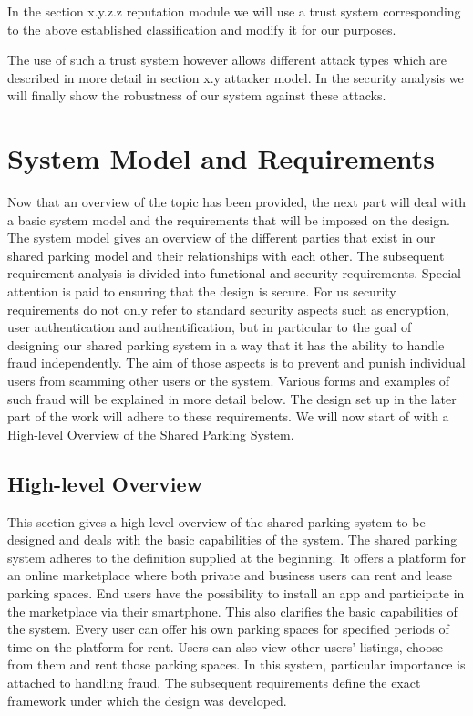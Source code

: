 \documentclass[
a4paper,     %
titlepage,   %
14pt         %
]{scrartcl}  %
\theoremstyle{mystyle}
\begin{document}
In the section x.y.z.z reputation module we will use a trust system corresponding to the above established classification and modify it for our purposes.

The use of such a trust system however allows different attack types which are described in more detail in section x.y attacker model. In the security analysis we will finally show the robustness of our system against these attacks.

\section{System Model and Requirements}
Now that an overview of the topic has been provided, the next part will deal with a basic system model and the requirements that will be imposed on the design. The system model gives an overview of the different parties that exist in our shared parking model and their relationships with each other. The subsequent requirement analysis is divided into functional and security requirements. Special attention is paid to ensuring that the design is secure. For us security requirements do not only refer to standard security aspects such as encryption, user authentication and authentification, but in particular to the goal of designing our shared parking system in a way that it has the ability to handle fraud independently. The aim of those aspects is to prevent and punish individual users from scamming other users or the system. Various forms and examples of such fraud will be explained in more detail below. The design set up in the later part of the work will adhere to these requirements. We will now start of with a High-level Overview of the Shared Parking System.

\subsection{High-level Overview}
This section gives a high-level overview of the shared parking system to be designed and deals with the basic capabilities of the system. The shared parking system adheres to the definition supplied at the beginning. It offers a platform for an online marketplace where both private and business users can rent and lease parking spaces. End users have the possibility to install an app and participate in the marketplace via their smartphone. This also clarifies the basic capabilities of the system. Every user can offer his own parking spaces for specified periods of time on the platform for rent. Users can also view other users' listings, choose from them and rent those parking spaces. In this system, particular importance is attached to handling fraud. The subsequent requirements define the exact framework under which the design was developed. 
\end{document}
